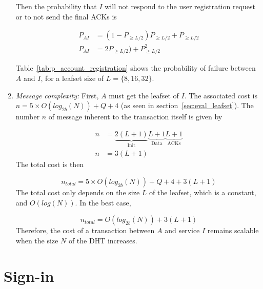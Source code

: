 \begin{enumerate}

    Then the probability that $I$ will not respond to the user registration
request or to not send the final ACKs is

    \begin{align}
      P_{AI} &= (1- P_{\ge L/2}) P_{\ge L/2} +  P_{\ge L/2} \\
      P_{AI} &= 2P_{\ge L/2}) + P^2_{\ge L/2}
    \end{align}


    Table~\eqref{tab:p_account_registration} shows the probability of failure
between $A$ and $I$, for a leafset size of $L = \{8,16,32\}$.

    
    \item{\textit{Message complexity:}}
    First, $A$ must get the leafset of $I$. The associated cost is $n = 5
\times O(log_{2b}(N)) + Q + 4$ (as seen in section~\ref{sec:eval_leafset}).
    The number $n$ of message inherent to the transaction itself is given by

    \begin{align}
      n &= \underbrace{2(L+1)}_\text{Init} \underbrace{L+1}_\text{Data} \underbrace{L+1}_\text{ACKs}\\
      n &= 3(L+1)
    \end{align}
     The total cost is then

    $$
      n_{total} = 5 \times O(log_{2b}(N)) + Q + 4 + 3(L+1)
    $$    
    The total cost only depends on the size $L$ of the leafset, which is a
constant, and $O(log(N))$. In the best case, 

    $$
      n_{total} = O(log_{2b}(N)) + 3(L+1)
    $$
    Therefore, the cost of a transaction between $A$ and service $I$ remains
scalable when the size $N$ of the DHT increases.

  \end{enumerate}


\section{Sign-in}
\label{sec:eval_sign_in}

